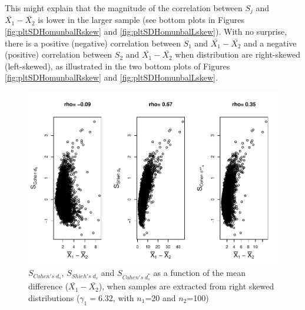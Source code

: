 \documentclass[
  english,
  man]{apa6}
\begin{document}
This might explain that the magnitude of the correlation between \(S_j\) and \(\bar{X_1}-\bar{X_2}\) is lower in the larger sample (see bottom plots in Figures \ref{fig:pltSDHomunbalRskew} and \ref{fig:pltSDHomunbalLskew}). With no surprise, there is a positive (negative) correlation between \(S_1\) and \(\bar{X_1}-\bar{X_2}\) and a negative (positive) correlation between \(S_2\) and \(\bar{X_1}-\bar{X_2}\) when distribution are right-skewed (left-skewed), as illustrated in the two bottom plots of Figures \ref{fig:pltSDHomunbalRskew} and \ref{fig:pltSDHomunbalLskew}.

\begin{figure}
\centering
\includegraphics{Correlation_files/figure-latex/pltStdzrHomunbalRskew-1.pdf}
\caption{\label{fig:pltStdzrHomunbalRskew}\(S_{Cohen's \; d_s}\), \(S_{Shieh's \; d_s}\) and \(S_{Cohen's \; d^*_s}\) as a function of the mean difference (\(\bar{X_1}-\bar{X_2}\)), when samples are extracted from right skewed distributions (\(\gamma_1 = 6.32\), with \(n_1\)=20 and \(n_2\)=100)}
\end{figure}
\end{document}
